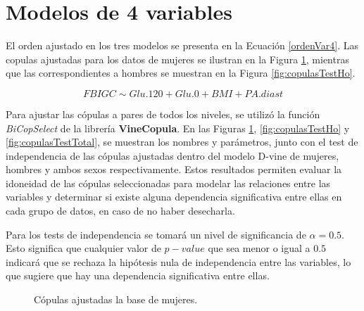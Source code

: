 
\section{Modelos de 4 variables}

El orden ajustado en los tres modelos se presenta en la Ecuación \eqref{ordenVar4}. Las copulas ajustadas para los datos de mujeres se ilustran en la Figura \ref{fig:copulasTestMu}, mientras que las correspondientes a hombres se muestran en la Figura \ref{fig:copulasTestHo}.

\begin{equation}\label{ordenVar4}
     FBIGC \sim Glu.120 + Glu.0 + BMI + PA.diast
\end{equation}

Para ajustar las cópulas a pares de todos los niveles, se utilizó la función \textit{BiCopSelect} de la librería \textbf{VineCopula}. En las Figuras  \ref{fig:copulasTestMu}, \ref{fig:copulasTestHo} y \ref{fig:copulasTestTotal}, se muestran los nombres y parámetros, junto con el test de independencia de las cópulas ajustadas dentro del modelo D-vine de mujeres, hombres y ambos sexos respectivamente. Estos resultados permiten evaluar la idoneidad de las cópulas seleccionadas para modelar las relaciones entre las variables y determinar si existe alguna dependencia significativa entre ellas en cada grupo de datos, en caso de no haber desecharla. 

Para los tests de independencia se tomará un nivel de significancia de $\alpha = 0.5$. Esto significa que cualquier valor de $p-value$ que sea menor o igual a $0.5$ indicará que se rechaza la hipótesis nula de independencia entre las variables, lo que sugiere que hay una dependencia significativa entre ellas.

\begin{figure}[H]
 \centering
    \caption{Cópulas ajustadas la base de mujeres.}
    \label{fig:copulasTestMu}
\end{figure}

